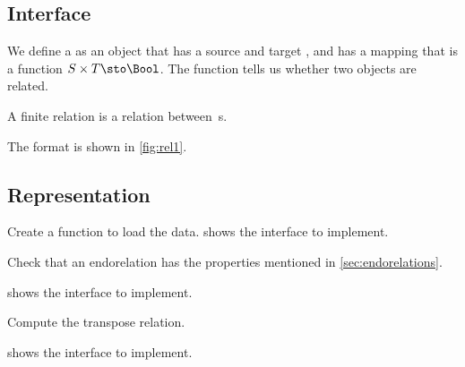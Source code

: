 
\subsection*{Interface}

We define a \Relation as an object that has a source and target \Setoid, and has a mapping that is a function $S \times T \sto \Bool$.
The function tells us whether two objects are related.


A finite relation  is a relation between \FiniteSet\,s.


The format is shown in \cref{fig:rel1}.

\subsection*{Representation}{}

\begin{marginfigure}
    \caption{}
    \label{fig:rel1}
\end{marginfigure}

\begin{codeexercise}
    Create a function to load the data.
     shows the interface to implement.

\end{codeexercise}


\begin{codeexercise}

    Check that an endorelation has the properties mentioned in \cref{sec:endorelations}.

     shows the interface to implement.
\end{codeexercise}


\begin{codeexercise}
    Compute the transpose relation.

     shows the interface to implement.
\end{codeexercise}

